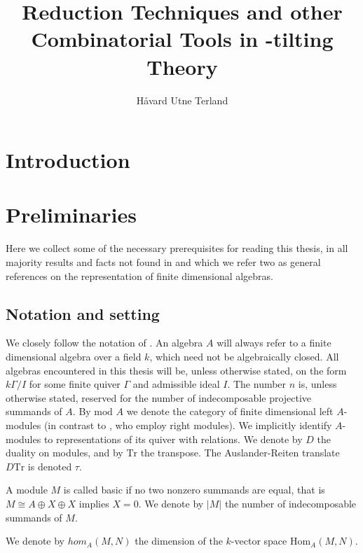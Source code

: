 \documentclass[]{article}
\title{Reduction Techniques and other Combinatorial Tools in \tu-tilting Theory}
\author{Håvard Utne Terland}
\theoremstyle{definition}
\newcommand{\mo}{\ensuremath{\text{mod }}}
\begin{document}
\maketitle

\begin{abstract}

\end{abstract}

\section{Introduction}


\section{Preliminaries}
Here we collect some of the necessary prerequisites for reading this thesis, in all majority results and facts not found in \cite{auslander_reiten_smalo_1995} and \cite{assem_skowronski_simson_2006} which we refer two as general references on the representation of finite dimensional algebras.

\subsection{Notation and setting}
We closely follow the notation of \cite{assem_skowronski_simson_2006}. An algebra $A$ will always refer to a finite dimensional algebra over a field $k$, which need not be algebraically closed. All algebras encountered in this thesis will be, unless otherwise stated, on the form $k\Gamma/I$ for some finite quiver $\Gamma$ and admissible ideal $I$. The number $n$ is, unless otherwise stated, reserved for the number of indecomposable projective summands of $A$. By $\mo A$ we denote the category of finite dimensional left $A$-modules (in contrast to \cite{assem_skowronski_simson_2006}, who employ right modules). We implicitly identify $A$-modules to representations of its quiver with relations. We denote by $D$ the duality on modules, and by $\text{Tr}$ the transpose. The Auslander-Reiten translate $D\text{Tr}$ is denoted $\tau$.

A module $M$ is called basic if no two nonzero summands are equal, that is $M \cong A \oplus X \oplus X$ implies $X = 0$. We denote by $|M|$ the number of indecomposable summands of $M$. 

We denote by $hom_A(M,N)$ the dimension of the $k$-vector space $\text{Hom}_A(M,N)$.
\end{document}
